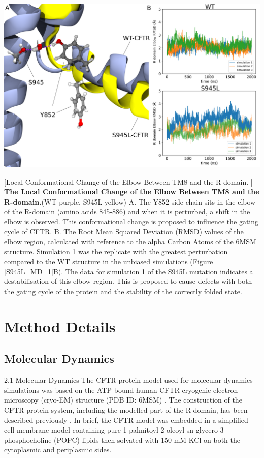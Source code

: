 \begin{center}
	\includegraphics[width=\textwidth]{figures/S945L/supp3_MD.pdf}
\end{center}
\captionsetup{singlelinecheck = false, justification=raggedright}
[Local Conformational Change of the Elbow Between TM8 and the R-domain. ] {\textbf{The Local Conformational Change of the Elbow Between TM8 and the R-domain.}}{(WT-purple, S945L-yellow) A. The Y852 side chain sits in the elbow of the R-domain (amino acids 845-886) and when it is perturbed, a shift in the elbow is observed. This conformational change is proposed to influence the gating cycle of CFTR. B. The Root Mean Squared Deviation (RMSD) values of the elbow region, calculated with reference to the alpha Carbon Atoms of the 6MSM structure. Simulation 1 was the replicate with the greatest perturbation compared to the WT structure in the unbiased simulations (Figure \ref{S945L_MD_1}B). The data for simulation 1 of the S945L mutation indicates a destabilisation of this elbow region. This is proposed to cause defects with both the gating cycle of the protein and the stability of the correctly folded state.}
\begingroup

\label{S945L_MD_S3}
\endgroup


\section{Method Details}
\subsection{Molecular Dynamics}
2.1 Molecular Dynamics
The CFTR protein model used for molecular dynamics simulations was based on the ATP-bound human CFTR cryogenic electron microscopy (cryo-EM) structure (PDB ID: 6MSM) \cite{zhang2018}. The construction of the CFTR protein system, including the modelled part of the R domain, has been described previously \cite{wong2022}. In brief, the CFTR model was embedded in a simplified cell membrane model containing pure 1-palmitoyl-2-oleoyl-sn-glycero-3-phosphocholine (POPC) lipids then solvated with 150 mM KCl on both the cytoplasmic and periplasmic sides.

